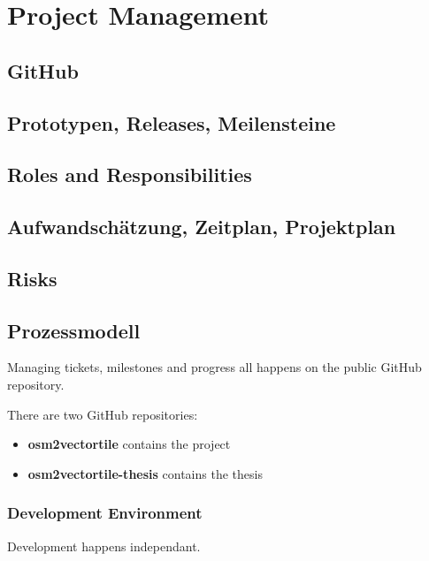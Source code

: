 \chapter{Project Management}\label{project-management}

\section{GitHub}\label{github}

\section{Prototypen, Releases, Meilensteine}

\section{Roles and Responsibilities}\label{roles-and-responsibilities}

\section{Aufwandschätzung, Zeitplan, Projektplan}

\section{Risks}\label{risks}

\section{Prozessmodell}




Managing tickets, milestones and progress all happens on the public
GitHub repository.

There are two GitHub repositories:

\begin{itemize}
\tightlist
\item
  \textbf{osm2vectortile} contains the project
\item
  \textbf{osm2vectortile-thesis} contains the thesis
\end{itemize}

\subsection{Development Environment}\label{development-environment}

Development happens independant.

